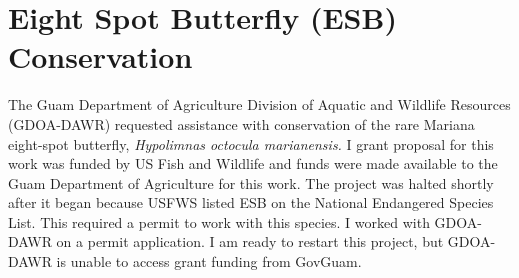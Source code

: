 \documentclass[12pt,english]{scrartcl}
\begin{document}
\begin{comment}
\raggedright\vspace{2mm}\textbf{Activity}
\begin{itemize}
\item I work closely with Jim McConnell's Guam Plant Extinction Prevention
Program. Many of Guam's rare plants are being attacked by invasive
insects. I routinely identify and document insect specimens collected
from the GPEPP plant nursery and from field surveys.
\item Annual report \cite{moore2018mcintirestennis2}.
\item Proposal \cite{moore2018mcintirestennis}.
\end{itemize}
\raggedright\vspace{2mm}\textbf{Reference(s)}

\begin{btSect}[vancouver]{zotero}
\btPrintCited
\end{btSect}
\newpage{}
\end{btUnit}

\begin{btUnit}
\end{comment}

\section{Eight Spot Butterfly (ESB) Conservation}

The Guam Department of Agriculture Division of Aquatic and Wildlife
Resources (GDOA-DAWR) requested assistance with conservation of the
rare Mariana eight-spot butterfly, \emph{Hypolimnas octocula marianensis.
}I grant proposal for this work was funded by US Fish and Wildlife
and funds were made available to the Guam Department of Agriculture
for this work. The project was halted shortly after it began because
USFWS listed ESB on the National Endangered Species List. This required
a permit to work with this species. I worked with GDOA-DAWR on a permit
application. I am ready to restart this project, but GDOA-DAWR is
unable to access grant funding from GovGuam.

\begin{comment}
\raggedright\vspace{2mm}\textbf{Activity}
\begin{itemize}
\item Progress on this project blocked by GovGuam beaurocracy. No progress
to report. \newpage{}
\end{itemize}
\end{btUnit}

\begin{btUnit}
\end{comment}
\end{document}
